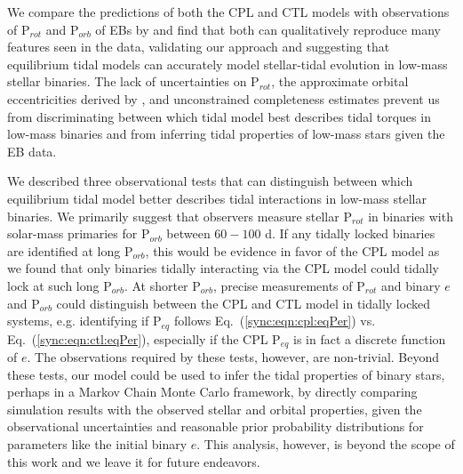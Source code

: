 We compare the predictions of both the CPL and CTL models with observations of P$_{rot}$ and P$_{orb}$ of \kepler EBs by \citet{Lurie2017} and find that both can qualitatively reproduce many features seen in the data, validating our approach and suggesting that equilibrium tidal models can accurately model stellar-tidal evolution in low-mass stellar binaries. The lack of uncertainties on P$_{rot}$, the approximate orbital eccentricities derived by \citet{Lurie2017}, and unconstrained completeness estimates prevent us from discriminating between which tidal model best describes tidal torques in low-mass binaries and from inferring tidal properties of low-mass stars given the \kepler EB data.  

We described three observational tests that can distinguish between which equilibrium tidal model better describes tidal interactions in low-mass stellar binaries. We primarily suggest that observers measure stellar P$_{rot}$ in binaries with solar-mass primaries for P$_{orb}$ between $60-100$ d. If any tidally locked binaries are identified at long P$_{orb}$, this would be evidence in favor of the CPL model as we found that only binaries tidally interacting via the CPL model could tidally lock at such long P$_{orb}$. At shorter P$_{orb}$, precise measurements of P$_{rot}$ and binary $e$ and P$_{orb}$ could distinguish between the CPL and CTL model in tidally locked systems, e.g. identifying if P$_{eq}$ follows Eq.~(\ref{sync:eqn:cpl:eqPer}) vs. Eq.~(\ref{sync:eqn:ctl:eqPer}), especially if the CPL P$_{eq}$ is in fact a discrete function of $e$. The observations required by these tests, however, are non-trivial. Beyond these tests, our model could be used to infer the tidal properties of binary stars, perhaps in a Markov Chain Monte Carlo framework, by directly comparing simulation results with the observed stellar and orbital properties, given the observational uncertainties and reasonable prior probability distributions for parameters like the initial binary $e$. This analysis, however, is beyond the scope of this work and we leave it for future endeavors.

